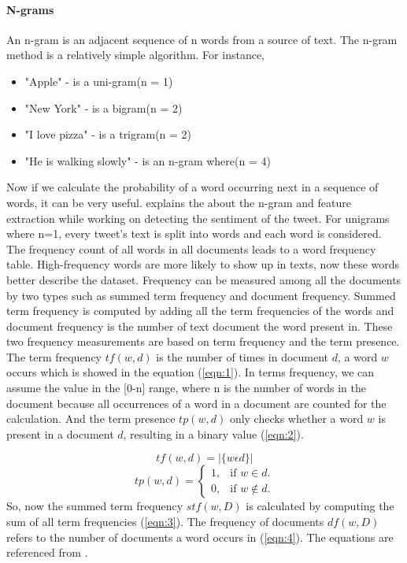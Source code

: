 \paragraph{N-grams} 


An n-gram is an adjacent sequence of n words from a source of text. The n-gram method is a relatively simple algorithm. For instance, 
\begin{itemize}
  \item "Apple" - is a uni-gram(n = 1)
  \item "New York" - is a bigram(n = 2)
  \item "I love pizza" - is a trigram(n = 2)
  \item "He is walking slowly" - is an n-gram where(n = 4)
\end{itemize}
Now if we calculate the probability of a word occurring next in a sequence of words, it can be very useful. \cite{groot2012data} explains the about the n-gram and feature extraction while working on detecting the sentiment of the tweet. For unigrams where n=1, every tweet's text is split into words and each word is considered. The frequency count of all words in all documents leads to a word frequency table. High-frequency words are more likely to show up in texts, now these words better describe the dataset. Frequency can be measured among all the documents by two types such as summed term frequency and document frequency. Summed term frequency is computed by adding all the term frequencies of the words and document frequency is the number of text document the word present in. These two frequency measurements are based on term frequency and the term presence. The term frequency $tf(w,d)$ is the number of times in document $d$, a word $w$ occurs which is showed in the equation (\ref{eqn:1}). In terms frequency, we can assume the value in the [0-n] range, where n is the number of words in the document because all occurrences of a word in a document are counted for the calculation. And the term presence $tp(w,d)$ only checks whether a word $w$ is present in a document $d$, resulting in a binary value (\ref{eqn:2}).

\begin{equation}
\label{eqn:1}
tf(w,d) = |\{w \epsilon d\}|
\end{equation}
\begin{equation}
\label{eqn:2}
  tp(w,d)=\begin{cases}
    1, & \text{if $w \in d$}.\\
    0, & \text{if $w \not\in d$}.
  \end{cases}
\end{equation}
So, now the summed term frequency $stf(w,D)$ is calculated by computing the sum of all term frequencies (\ref{eqn:3}). The frequency of documents $df(w,D)$ refers to the number of documents a word occurs in (\ref{eqn:4}). The equations are referenced from \cite{groot2012data}.

